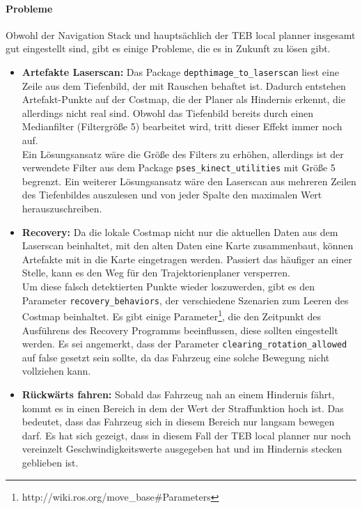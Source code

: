 \paragraph{Probleme}
Obwohl der Navigation Stack und haupts\"achlich der TEB local planner insgesamt gut eingestellt sind, gibt es einige Probleme, die es in Zukunft zu l\"osen gibt.
\begin{itemize}
	\item \textbf{Artefakte Laserscan:} Das Package \texttt{depthimage\_to\_laserscan} liest eine Zeile aus dem Tiefenbild, der mit Rauschen behaftet ist. Dadurch entstehen Artefakt-Punkte auf der Costmap, die der Planer als Hindernis erkennt, die allerdings nicht real sind. Obwohl das Tiefenbild bereits durch einen Medianfilter (Filtergr\"o\ss{}e 5) bearbeitet wird, tritt dieser Effekt immer noch auf. \\
	Ein L\"osungsansatz w\"are die Gr\"o\ss{}e des Filters zu erh\"ohen, allerdings ist der verwendete Filter aus dem Package \texttt{pses\_kinect\_utilities} mit Gr\"o\ss{}e 5 begrenzt. Ein weiterer L\"osungsansatz w\"are den Laserscan aus mehreren Zeilen des Tiefenbildes auszulesen und von jeder Spalte den maximalen Wert herauszuschreiben. 
	\item \textbf{Recovery:} Da die lokale Costmap nicht nur die aktuellen Daten aus dem Laserscan beinhaltet, mit den alten Daten eine Karte zusammenbaut, k\"onnen Artefakte mit in die Karte eingetragen werden. Passiert das h\"aufiger an einer Stelle, kann es den Weg f\"ur den Trajektorienplaner versperren.\\
	Um diese falsch detektierten Punkte wieder loszuwerden, gibt es den Parameter \texttt{recovery\_behaviors}, der verschiedene Szenarien zum Leeren des Costmap beinhaltet. Es gibt einige Parameter\footnote{http://wiki.ros.org/move\_base\#Parameters}, die den Zeitpunkt des Ausf\"uhrens des Recovery Programms beeinflussen, diese sollten eingestellt werden. Es sei angemerkt, dass der Parameter \texttt{clearing\_rotation\_allowed} auf false gesetzt sein sollte, da das Fahrzeug eine solche Bewegung nicht vollziehen kann.
	\item \textbf{R\"uckw\"arts fahren:} Sobald das Fahrzeug nah an einem Hindernis f\"ahrt, kommt es in einen Bereich in dem der Wert der Straffunktion hoch ist. Das bedeutet, dass das Fahrzeug sich in diesem Bereich nur langsam bewegen darf. Es hat sich gezeigt, dass in diesem Fall der TEB local planner nur noch vereinzelt Geschwindigkeitswerte ausgegeben hat und im Hindernis stecken geblieben ist.\\

\end{itemize}
